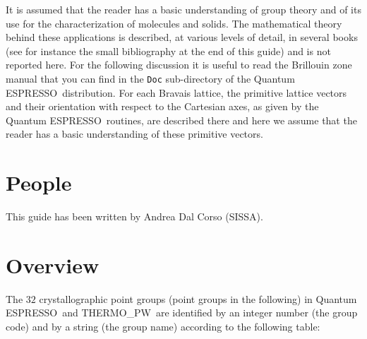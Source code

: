 \documentclass[12pt,a4paper]{article}
\def\qe{{\sc Quantum ESPRESSO}}
\def\tpw{{\sc THERMO\_PW}}
\begin{document}
It is assumed that the reader has a basic understanding of group theory and
of its use for the characterization of molecules and solids.
The mathematical theory behind these applications is described, 
at various levels of detail, in several books (see for instance the small 
bibliography at the end of this guide) and is not reported here. 
For the following discussion it is useful to read the Brillouin zone 
manual that you can find in the \texttt{Doc} sub-directory of the 
\qe\ distribution. For each Bravais lattice, the primitive lattice vectors
and their orientation with respect to the Cartesian axes, as given by the
\qe\ routines, are described there and here we assume that the reader has a
basic understanding of these primitive vectors. 

\section{\color{coral}People}
This guide has been written by Andrea Dal Corso (SISSA).

\section{\color{coral}Overview}
The $32$ crystallographic point groups (point groups in the following)
in \qe\ and \tpw\ are identified by an integer number (the group code) and 
by a string (the group name) according to the following table:
\end{document}
